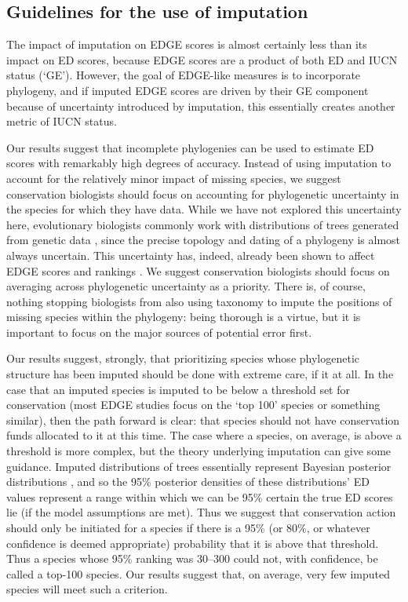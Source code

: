 \documentclass[12pt,english]{article}
\begin{document}
\subsection*{Guidelines for the use of imputation}
The impact of imputation on EDGE scores is almost certainly less than its impact
on ED scores, because EDGE scores are a product of both ED and IUCN status
(‘GE’). However, the goal of EDGE-like measures is to incorporate phylogeny, and
if imputed EDGE scores are driven by their GE component because of uncertainty
introduced by imputation, this essentially creates another metric of IUCN
status.

Our results suggest that incomplete phylogenies can be used to estimate ED
scores with remarkably high degrees of accuracy. Instead of using imputation to
account for the relatively minor impact of missing species, we suggest
conservation biologists should focus on accounting for phylogenetic uncertainty
in the species for which they have data. While we have not explored this
uncertainty here, evolutionary biologists commonly work with distributions of
trees generated from genetic data \autocite[reviewed in][]{Huelsenbeck2001,
Bollback2005}, since the precise topology and dating of a phylogeny is almost
always uncertain. This uncertainty has, indeed, already been shown to affect
EDGE scores and rankings \autocite{Pearse2015}. We suggest conservation
biologists should focus on averaging across phylogenetic uncertainty as a
priority. There is, of course, nothing stopping biologists from also using
taxonomy to impute the positions of missing species within the phylogeny: being
thorough is a virtue, but it is important to focus on the major sources of
potential error first.

Our results suggest, strongly, that prioritizing species whose phylogenetic
structure has been imputed should be done with extreme care, if it at all. In
the case that an imputed species is imputed to be below a threshold set for
conservation (most EDGE studies focus on the ‘top 100’ species or something
similar), then the path forward is clear: that species should not have
conservation funds allocated to it at this time. The case where a species, on
average, is above a threshold is more complex, but the theory underlying
imputation can give some guidance. Imputed distributions of trees essentially
represent Bayesian posterior distributions \autocite{Kuhn2011}, and
so the 95\% posterior densities of these distributions’ ED values represent a
range within which we can be 95\% certain the true ED scores lie (if the model
assumptions are met). Thus we suggest that conservation action should only be
initiated for a species if there is a 95\% (or 80\%, or whatever confidence is
deemed appropriate) probability that it is above that threshold. Thus a species
whose 95\% ranking was 30–300 could not, with confidence, be called a top-100
species. Our results suggest that, on average, very few imputed species will
meet such a criterion.
\end{document}
